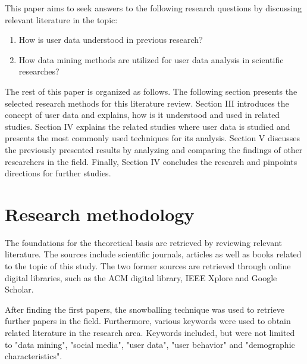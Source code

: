 \documentclass[conference]{IEEEtran}
\begin{document}
This paper aims to seek answers to the following research questions by discussing relevant literature in the topic: 

\setdefaultleftmargin{40pt}{}{}{}{}{}
\begin{enumerate}[label=RQ\arabic*:]
	\item How is user data understood in previous research?
	\item How data mining methods are utilized for user data analysis in scientific researches?
\end{enumerate}

The rest of this paper is organized as follows. The following section presents the selected research methods for this literature review. Section III introduces the concept of user data and explains, how is it understood and used in related studies. Section IV explains the related studies where user data is studied and presents the most commonly used techniques for its analysis. Section V discusses the previously presented results by analyzing and comparing the findings of other researchers in the field. Finally, Section IV concludes the research and pinpoints directions for further studies. 

\section{Research methodology}
The foundations for the theoretical basis are retrieved by reviewing relevant literature. The sources include scientific journals, articles as well as books related to the topic of this study. The two former sources are retrieved through online digital libraries, such as the ACM digital library, IEEE Xplore and Google Scholar. 

After finding the first papers, the snowballing technique was used to retrieve further papers in the field. Furthermore, various keywords were used to obtain related literature in the research area. Keywords included, but were not limited to "data mining", "social media", "user data", "user behavior" and "demographic characteristics". 

\end{document}
